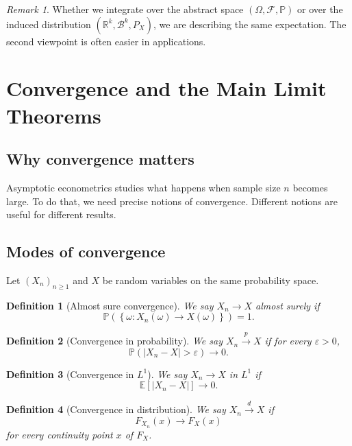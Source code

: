 \documentclass[11pt]{article}
\newtheorem{definition}{Definition}[section]
\theoremstyle{remark}
\newtheorem{remark}{Remark}[section]
\newcommand{\R}{\mathbb{R}}
\newcommand{\PP}{\mathbb{P}}
\newcommand{\EE}{\mathbb{E}}
\newcommand{\1}{\mathbbm{1}}
\newcommand{\cF}{\mathcal{F}}
\newcommand{\cB}{\mathcal{B}}
\begin{document}
\begin{remark}
Whether we integrate over the abstract space \((\Omega,\cF,\PP)\) or over the induced distribution \((\R^k,\cB^k,P_X)\), we are describing the same expectation. The second viewpoint is often easier in applications.
\end{remark}

\section{Convergence and the Main Limit Theorems}

\subsection{Why convergence matters}

Asymptotic econometrics studies what happens when sample size \(n\) becomes large. To do that, we need precise notions of convergence. Different notions are useful for different results.

\subsection{Modes of convergence}

Let \((X_n)_{n\ge 1}\) and \(X\) be random variables on the same probability space.

\begin{definition}[Almost sure convergence]
We say \(X_n \to X\) \emph{almost surely} if
\[
  \PP\left(\left\{\omega : X_n(\omega) \to X(\omega)\right\}\right)=1.
\]
\end{definition}

\begin{definition}[Convergence in probability]
We say \(X_n \xrightarrow{p} X\) if for every \(\varepsilon>0\),
\[
  \PP(|X_n-X|>\varepsilon)\to 0.
\]
\end{definition}

\begin{definition}[Convergence in \(L^1\)]
We say \(X_n \to X\) in \(L^1\) if
\[
  \EE[|X_n-X|]\to 0.
\]
\end{definition}

\begin{definition}[Convergence in distribution]
We say \(X_n \xrightarrow{d} X\) if
\[
  F_{X_n}(x)\to F_X(x)
\]
for every continuity point \(x\) of \(F_X\).
\end{definition}
\end{document}
